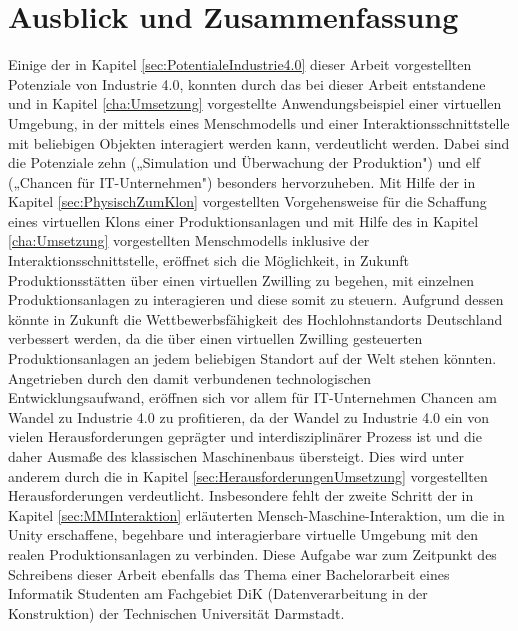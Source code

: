 \chapter{Ausblick und Zusammenfassung}\label{cha:AusblickUndFazit}

Einige der in Kapitel \ref{sec:PotentialeIndustrie4.0} dieser Arbeit vorgestellten Potenziale von Industrie 4.0, konnten durch das bei dieser Arbeit entstandene und in Kapitel \ref{cha:Umsetzung} vorgestellte Anwendungsbeispiel einer virtuellen Umgebung, in der mittels eines Menschmodells und einer Interaktionsschnittstelle mit beliebigen Objekten interagiert werden kann, verdeutlicht werden. Dabei sind die Potenziale zehn („Simulation und Überwachung der Produktion") und elf („Chancen für IT-Unternehmen") besonders hervorzuheben.
\newline
Mit Hilfe der in Kapitel \ref{sec:PhysischZumKlon} vorgestellten Vorgehensweise für die Schaffung eines virtuellen Klons einer Produktionsanlagen und mit Hilfe des in Kapitel \ref{cha:Umsetzung} vorgestellten Menschmodells inklusive der Interaktionsschnittstelle, eröffnet sich die Möglichkeit, in Zukunft Produktionsstätten über einen virtuellen Zwilling zu begehen, mit einzelnen Produktionsanlagen zu interagieren und diese somit zu steuern. Aufgrund dessen könnte in Zukunft die Wettbewerbsfähigkeit des Hochlohnstandorts Deutschland verbessert werden, da die über einen virtuellen Zwilling gesteuerten Produktionsanlagen an jedem beliebigen Standort auf der Welt stehen könnten.
\newline
Angetrieben durch den damit verbundenen technologischen Entwicklungsaufwand, eröffnen sich vor allem für IT-Unternehmen Chancen am Wandel zu Industrie 4.0 zu profitieren, da der Wandel zu Industrie 4.0 ein von vielen Herausforderungen geprägter und interdisziplinärer Prozess ist und die daher Ausmaße des klassischen Maschinenbaus übersteigt. Dies wird unter anderem durch die in Kapitel \ref{sec:HerausforderungenUmsetzung} vorgestellten Herausforderungen verdeutlicht. Insbesondere fehlt der zweite Schritt der in Kapitel \ref{sec:MMInteraktion} erläuterten Mensch-Maschine-Interaktion, um die in Unity erschaffene, begehbare und interagierbare virtuelle Umgebung mit den realen Produktionsanlagen zu verbinden. Diese Aufgabe war zum Zeitpunkt des Schreibens dieser Arbeit ebenfalls das Thema einer Bachelorarbeit eines Informatik Studenten am Fachgebiet DiK (Datenverarbeitung in der Konstruktion) der Technischen Universität Darmstadt.

